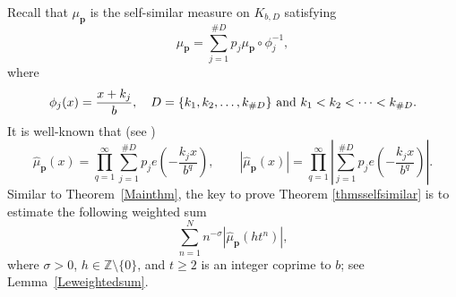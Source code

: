 \documentclass[amssymb,amsfonts,refcheck,12pt,verbatim,righttag]{amsart}
\numberwithin{equation}{section} %
\theoremstyle{plain}
\begin{document}
Recall that $\mu_{\mathbf{p}}$ is the self-similar measure on $K_{b,D}$ satisfying 
\[\mu_{\mathbf{p}}=\sum_{j=1}^{\#D}p_j\mu_{\mathbf{p}}\circ\phi_j^{-1},\]
where 
\[\phi_j(x)=\frac{x+k_j}{b}, \quad D=\{k_1,k_2,\ldots, k_{\#D}\}\ {\rm and}\  k_1<k_2<\cdots<k_{\#D}.\]
It is well-known that (see \cite[page 342]{Strichartz1993})
\begin{equation*}
\widehat\mu_{\mathbf{p}}(x)
	= \prod_{q=1}^{\infty}\sum_{j=1}^{\#D}p_{j}e\left(-\frac{k_{j}x}{b^{q}}\right),
	\qquad
|\widehat\mu_{\mathbf{p}}(x)|
	= \prod_{q=1}^{\infty}\left|\sum_{j=1}^{\#D}p_{j}e\left(-\frac{k_{j}x}{b^{q}}\right)\right|.
\end{equation*}
Similar to Theorem~\ref{Mainthm}, 
the key to prove Theorem \ref{thmsselfsimilar} is to estimate the following weighted sum
\begin{equation*}
\sum_{n=1}^{N}n^{-\sigma}|\widehat{\mu}_{\mathbf{p}}(ht^{n})|,
\end{equation*}
where  $\sigma>0$, $h\in\mathbb{Z}\setminus\{0\}$, and $t\geq2$ is an integer coprime to $b$; see Lemma~\ref{Leweightedsum}. 
\end{document}

